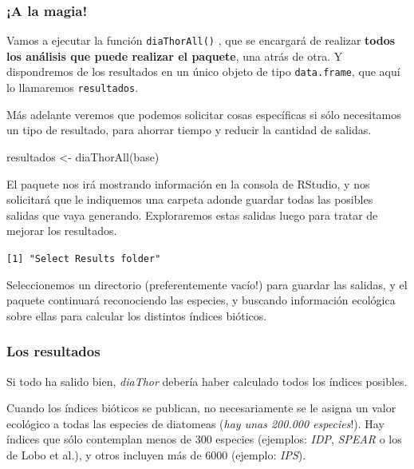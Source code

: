 \documentclass[
]{book}
\newenvironment{Shaded}{\begin{snugshade}}{\end{snugshade}}
\newcommand{\FunctionTok}[1]{\textcolor[rgb]{0.00,0.00,0.00}{#1}}
\newcommand{\NormalTok}[1]{#1}
\newcommand{\OtherTok}[1]{\textcolor[rgb]{0.56,0.35,0.01}{#1}}
\begin{document}
\hypertarget{a-la-magia}{%
\subsubsection{\texorpdfstring{\textbf{¡A la magia!}}{¡A la magia!}}\label{a-la-magia}}

Vamos a ejecutar la función \texttt{diaThorAll()} , que se encargará de realizar \textbf{todos los análisis que puede realizar el paquete}, una atrás de otra. Y dispondremos de los resultados en un único objeto de tipo \texttt{data.frame}, que aquí lo llamaremos \texttt{resultados}.

Más adelante veremos que podemos solicitar cosas específicas si sólo necesitamos un tipo de resultado, para ahorrar tiempo y reducir la cantidad de salidas.

\begin{Shaded}
\begin{Highlighting}[]
\NormalTok{resultados }\OtherTok{\textless{}{-}} \FunctionTok{diaThorAll}\NormalTok{(base)}
\end{Highlighting}
\end{Shaded}

El paquete nos irá mostrando información en la consola de RStudio, y nos solicitará que le indiquemos una carpeta adonde guardar todas las posibles salidas que vaya generando. Exploraremos estas salidas luego para tratar de mejorar los resultados.

\texttt{{[}1{]}\ "Select\ Results\ folder"}

Seleccionemos un directorio (preferentemente vacío!) para guardar las salidas, y el paquete continuará reconociendo las especies, y buscando información ecológica sobre ellas para calcular los distintos índices bióticos.

\hypertarget{los-resultados}{%
\subsubsection{Los resultados}\label{los-resultados}}

Si todo ha salido bien, \emph{diaThor} debería haber calculado todos los índices posibles.

Cuando los índices bióticos se publican, no necesariamente se le asigna un valor ecológico a todas las especies de diatomeas (\emph{hay unas 200.000 especies}!). Hay índices que sólo contemplan menos de 300 especies (ejemplos: \emph{IDP}, \emph{SPEAR} o los de Lobo et al.), y otros incluyen más de 6000 (ejemplo: \emph{IPS}).
\end{document}
